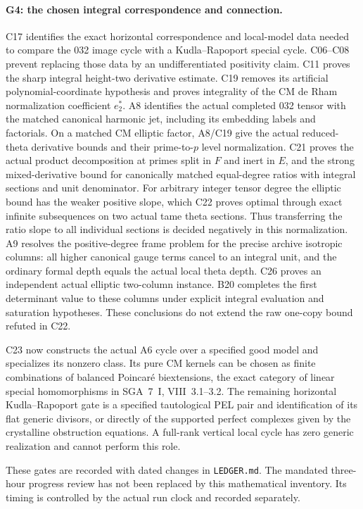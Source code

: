 \documentclass[11pt]{article}
\theoremstyle{definition}\newtheorem{definition}[theorem]{Definition}\newtheorem{remark}[theorem]{Remark}
\begin{document}
\paragraph{G4: the chosen integral correspondence and connection.}
C17 identifies the exact horizontal correspondence and local-model
data needed to compare the 032 image cycle with a Kudla--Rapoport
special cycle. C06--C08 prevent replacing those data by an
undifferentiated positivity claim. C11 proves the sharp integral
height-two derivative estimate. C19 removes its artificial
polynomial-coordinate hypothesis and proves integrality of the
CM de Rham normalization coefficient $e_2^*$.
A8 identifies the actual completed 032 tensor with the matched
canonical harmonic jet, including its embedding labels and
factorials. On a matched CM elliptic factor, A8/C19 give the
actual reduced-theta derivative bounds and their prime-to-$p$
level normalization. C21 proves the actual product decomposition
at primes split in $F$ and inert in $E$, and the strong
mixed-derivative bound for canonically matched equal-degree
ratios with integral sections and unit denominator.
For arbitrary integer tensor degree the elliptic bound has
the weaker positive slope, which C22 proves optimal through
exact infinite subsequences on two actual tame theta sections.
Thus transferring the ratio slope to all individual sections
is decided negatively in this normalization.
A9 resolves the positive-degree frame problem for the precise
archive isotropic columns: all higher canonical gauge terms
cancel to an integral unit, and the ordinary formal depth
equals the actual local theta depth. C26 proves an independent
actual elliptic two-column instance. B20 completes the first
determinant value to these columns under explicit integral
evaluation and saturation hypotheses. These conclusions do
not extend the raw one-copy bound refuted in C22.

C23 now constructs the actual A6 cycle over a specified good
model and specializes its nonzero class. Its pure CM kernels
can be chosen as finite combinations of balanced Poincar\'e
biextensions, the exact category of linear special homomorphisms
in SGA~7~I, VIII~3.1--3.2. The remaining horizontal
Kudla--Rapoport gate is a specified tautological PEL pair and
identification of its flat generic divisors, or directly of
the supported perfect complexes given by the crystalline
obstruction equations. A full-rank vertical local cycle has
zero generic realization and cannot perform this role.

These gates are recorded with dated changes in \texttt{LEDGER.md}.
The mandated three-hour progress review has not been replaced by
this mathematical inventory. Its timing is controlled by the actual
run clock and recorded separately.
\end{document}
